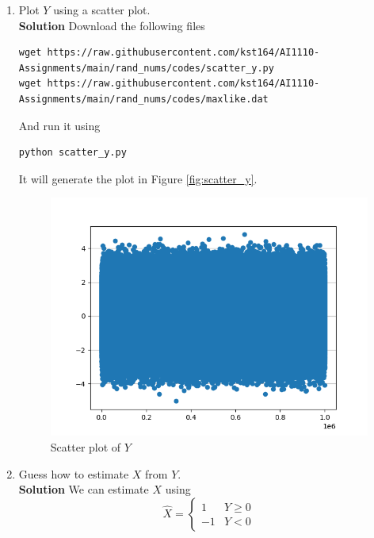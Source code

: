 \documentclass[journal, 12pt, twocolumn]{IEEEtran}
\begin{document}
\begin{enumerate}[label=\arabic{section}.\arabic*]
    \item
        Plot $Y$ using a scatter plot.
        \\
        \textbf{Solution} Download the following files
        \begin{lstlisting}
wget https://raw.githubusercontent.com/kst164/AI1110-Assignments/main/rand_nums/codes/scatter_y.py
wget https://raw.githubusercontent.com/kst164/AI1110-Assignments/main/rand_nums/codes/maxlike.dat
        \end{lstlisting}
        And run it using
        \begin{lstlisting}
python scatter_y.py
        \end{lstlisting}
        It will generate the plot in Figure \eqref{fig:scatter_y}.
        \begin{figure}[!ht]
            \includegraphics[width=\columnwidth]{figs/scatter_y.png}
            \caption{Scatter plot of $Y$}
            \label{fig:scatter_y}
        \end{figure}

    \item
        Guess how to estimate $X$ from $Y$.
        \\
        \textbf{Solution} We can estimate $X$ using
        \begin{equation}
            \hat{X} = \begin{cases}
                1 & Y \geq 0 \\
                -1 & Y < 0
            \end{cases}
        \end{equation}


\end{enumerate}
\end{document}
